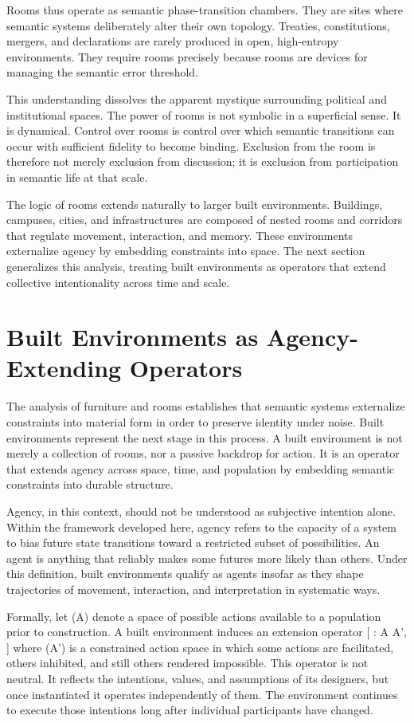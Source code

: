 \documentclass[11pt,oneside]{article}
\begin{document}
Rooms thus operate as semantic phase-transition chambers. They are sites where semantic systems deliberately alter their own topology. Treaties, constitutions, mergers, and declarations are rarely produced in open, high-entropy environments. They require rooms precisely because rooms are devices for managing the semantic error threshold.

This understanding dissolves the apparent mystique surrounding political and institutional spaces. The power of rooms is not symbolic in a superficial sense. It is dynamical. Control over rooms is control over which semantic transitions can occur with sufficient fidelity to become binding. Exclusion from the room is therefore not merely exclusion from discussion; it is exclusion from participation in semantic life at that scale.

The logic of rooms extends naturally to larger built environments. Buildings, campuses, cities, and infrastructures are composed of nested rooms and corridors that regulate movement, interaction, and memory. These environments externalize agency by embedding constraints into space. The next section generalizes this analysis, treating built environments as operators that extend collective intentionality across time and scale.

\section{Built Environments as Agency-Extending Operators}

The analysis of furniture and rooms establishes that semantic systems externalize constraints into material form in order to preserve identity under noise. Built environments represent the next stage in this process. A built environment is not merely a collection of rooms, nor a passive backdrop for action. It is an operator that extends agency across space, time, and population by embedding semantic constraints into durable structure.

Agency, in this context, should not be understood as subjective intention alone. Within the framework developed here, agency refers to the capacity of a system to bias future state transitions toward a restricted subset of possibilities. An agent is anything that reliably makes some futures more likely than others. Under this definition, built environments qualify as agents insofar as they shape trajectories of movement, interaction, and interpretation in systematic ways.

Formally, let (A) denote a space of possible actions available to a population prior to construction. A built environment induces an extension operator
[
 : A \rightarrow A',
]
where (A') is a constrained action space in which some actions are facilitated, others inhibited, and still others rendered impossible. This operator is not neutral. It reflects the intentions, values, and assumptions of its designers, but once instantiated it operates independently of them. The environment continues to execute those intentions long after individual participants have changed.
\end{document}
